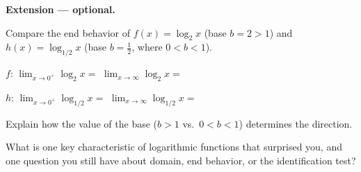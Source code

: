 \documentclass[10pt]{article}
\begin{document}
\begin{extensionbox}
\textbf{Extension --- optional.}

Compare the end behavior of $f(x) = \log_2 x$ (base $b = 2 > 1$) and $h(x) = \log_{1/2} x$
(base $b = \tfrac{1}{2}$, where $0 < b < 1$).

\vspace{6pt}
$f$: \quad $\displaystyle\lim_{x \to 0^+}\log_2 x = $ \ans{$-\infty$} \quad
$\displaystyle\lim_{x \to \infty}\log_2 x = $ \ans{$+\infty$}

\vspace{6pt}
$h$: \quad $\displaystyle\lim_{x \to 0^+}\log_{1/2} x = $ \ans{$+\infty$} \quad
$\displaystyle\lim_{x \to \infty}\log_{1/2} x = $ \ans{$-\infty$}

\vspace{6pt}
Explain how the value of the base ($b > 1$ vs.\ $0 < b < 1$) determines the direction.

\end{extensionbox}

\vspace{0.1in}

\begin{reflectionbox}
What is one key characteristic of logarithmic functions that surprised you, and one question you
still have about domain, end behavior, or the identification test?

\end{reflectionbox}
\end{document}
